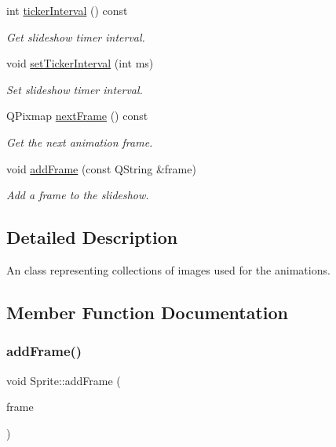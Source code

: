 \begin{DoxyCompactItemize}
int \hyperlink{class_sprite_a90bbd615de28db60579c4d09e2bb3f39}{ticker\+Interval} () const
\begin{DoxyCompactList}\small\item\em Get slideshow timer interval. \end{DoxyCompactList}\item 
void \hyperlink{class_sprite_af46f090f361ddf8fe868091be338d2a8}{set\+Ticker\+Interval} (int ms)
\begin{DoxyCompactList}\small\item\em Set slideshow timer interval. \end{DoxyCompactList}\item 
Q\+Pixmap \hyperlink{class_sprite_a01919084b25446f54dc120264d1715db}{next\+Frame} () const
\begin{DoxyCompactList}\small\item\em Get the next animation frame. \end{DoxyCompactList}\item 
void \hyperlink{class_sprite_a166d1759639fa16f0577f3257bdd2bb8}{add\+Frame} (const Q\+String \&frame)
\begin{DoxyCompactList}\small\item\em Add a frame to the slideshow. \end{DoxyCompactList}\end{DoxyCompactItemize}


\subsection{Detailed Description}
An class representing collections of images used for the animations. 

\subsection{Member Function Documentation}
\mbox{\label{class_sprite_a166d1759639fa16f0577f3257bdd2bb8}} 
\subsubsection{\texorpdfstring{add\+Frame()}{addFrame()}}
{\footnotesize\ttfamily void Sprite\+::add\+Frame (\begin{DoxyParamCaption}\item[{const Q\+String \&}]{frame }\end{DoxyParamCaption})}



